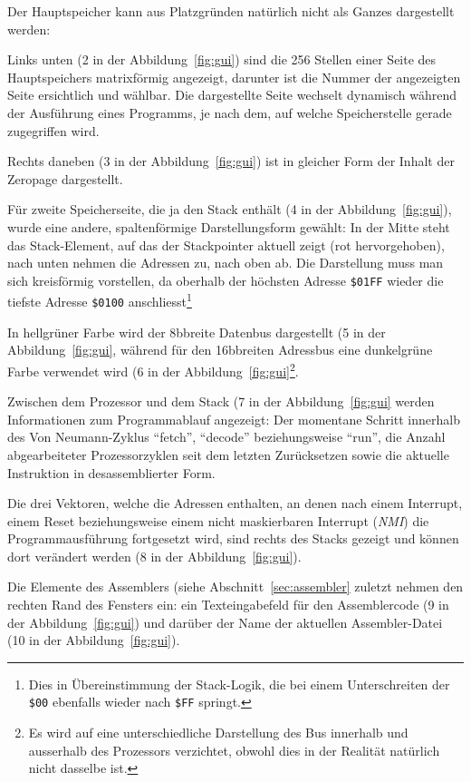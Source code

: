 \documentclass[11pt]{scrartcl}
\newcommand{\bit}{\unit{b}}
\newcommand{\hex}[1]{\texttt{\$#1}}
\begin{document}
Der Hauptspeicher kann aus Platzgründen natürlich nicht als Ganzes
dargestellt werden:

Links unten (2 in der Abbildung~\ref{fig:gui}) sind die 256 Stellen
einer Seite des Hauptspeichers matrixförmig angezeigt, darunter ist
die Nummer der angezeigten Seite ersichtlich und wählbar. Die
dargestellte Seite wechselt dynamisch während der Ausführung eines
Programms, je nach dem, auf welche Speicherstelle gerade zugegriffen
wird.


Rechts daneben (3 in der Abbildung~\ref{fig:gui}) ist in gleicher Form
der Inhalt der Zeropage dargestellt.

Für zweite Speicherseite, die ja den Stack enthält (4 in
der Abbildung~\ref{fig:gui}), wurde eine andere, spaltenförmige
Darstellungsform gewählt: In der Mitte steht das Stack-Element, auf
das der Stackpointer aktuell zeigt (rot hervorgehoben), nach unten
nehmen die Adressen zu, nach oben ab. Die Darstellung muss man sich
kreisförmig vorstellen, da oberhalb der höchsten Adresse \hex{01FF}
wieder die tiefste Adresse \hex{0100} anschliesst\footnote{Dies in
  Übereinstimmung der Stack-Logik, die bei einem Unterschreiten der
  \hex{00} ebenfalls wieder nach \hex{FF} springt.}

In hellgrüner Farbe wird der 8\bit breite Datenbus dargestellt (5 in
der Abbildung~\ref{fig:gui}, während für den 16\bit breiten Adressbus
eine dunkelgrüne Farbe verwendet wird (6 in der
Abbildung~\ref{fig:gui}\footnote{Es wird auf eine unterschiedliche
  Darstellung des Bus innerhalb und ausserhalb des Prozessors
  verzichtet, obwohl dies in der Realität natürlich nicht dasselbe
  ist.}.

Zwischen dem Prozessor und dem Stack (7 in der Abbildung~\ref{fig:gui}
werden Informationen zum
Programmablauf angezeigt: Der momentane Schritt innerhalb des Von
Neumann-Zyklus "`fetch"', "`decode"' beziehungsweise "`run"', die
Anzahl abgearbeiteter Prozessorzyklen seit dem letzten Zurücksetzen
sowie die aktuelle Instruktion in desassemblierter Form.

Die drei Vektoren, welche die Adressen enthalten, an denen nach einem
Interrupt, einem Reset beziehungsweise einem nicht maskierbaren
Interrupt (\emph{NMI}) die Programmausführung fortgesetzt wird, sind
rechts des Stacks gezeigt und können dort verändert werden (8 in der
Abbildung~\ref{fig:gui}).

Die Elemente des Assemblers (siehe Abschnitt~\ref{sec:assembler}
zuletzt nehmen den rechten Rand des Fensters ein: ein Texteingabefeld
für den Assemblercode (9 in der Abbildung~\ref{fig:gui}) und darüber
der Name der aktuellen Assembler-Datei (10 in der
Abbildung~\ref{fig:gui}).
\end{document}
